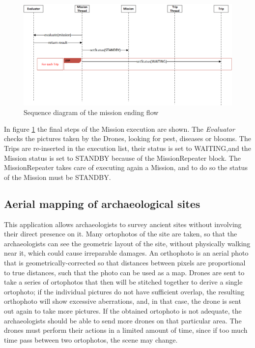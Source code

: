 \begin{figure}[h!]
  \centering
  \includegraphics[width=\linewidth]{pictures/Alfalfa_Sequence_MissionEnd.png}
  \caption{Sequence diagram of the mission ending flow}
  \label{fig:alfalfaSequence4}
\end{figure}

In figure \ref{fig:alfalfaSequence4} the final steps of the Mission execution are shown.
The \textit{Evaluator} checks the pictures taken by the Drones, looking for pest, diseases or blooms.
The Trips are re-inserted in the execution list, their status is set to WAITING,and the Mission status is set to STANDBY because of the MissionRepeater block.
The MissionRepeater takes care of executing again a Mission, and to do so the status of the Mission must be STANDBY.
\\

\subsection{Aerial mapping of archaeological sites}\label{aerialMapping}

This application allows archaeologists to survey ancient sites without involving their direct presence on it.
Many ortophotos of the site are taken, so that the archaeologists can see the geometric layout of the site, without physically walking near it, which could cause irreparable damages.
An orthophoto is an aerial photo that is geometrically-corrected so that distances between pixels are proportional to true distances, such that the photo can be used as a map.
Drones are sent to take a series of ortophotos that then will be stitched together to derive a single ortophoto; if the individual pictures do not have sufficient overlap, the resulting orthophoto will show excessive aberrations, and, in that case, the drone is sent out again to take more pictures.
If the obtained ortophoto is not adequate, the archaeologists should be able to send more drones on that particular area.
The drones must perform their actions in a limited amount of time, since if too much time pass between two ortophotos, the scene may change.
\\

